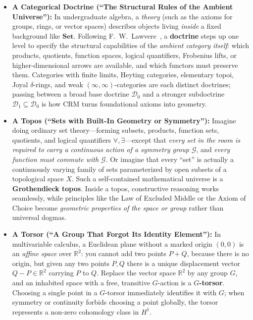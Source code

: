 \documentclass[10pt,twoside,openright]{book}
\theoremstyle{crmplain}
\theoremstyle{crmdef}
\theoremstyle{crmremark}
\begin{document}
\begin{itemize}
  \item \textbf{A Categorical Doctrine (``The Structural Rules of the Ambient Universe''):} In undergraduate algebra, a \emph{theory} (such as the axioms for groups, rings, or vector spaces) describes objects living \emph{inside} a fixed background like $\mathbf{Set}$. Following F.~W.~Lawvere~\cite{Lawvere69}, a \textbf{doctrine} steps up one level to specify the structural capabilities of the \emph{ambient category itself}: which products, quotients, function spaces, logical quantifiers, Frobenius lifts, or higher-dimensional arrows are available, and which functors must preserve them. Categories with finite limits, Heyting categories, elementary topoi, Joyal $\delta$-rings, and weak $(\infty, \infty)$-categories are each distinct doctrines; passing between a broad base doctrine $\mathcal{D}_0$ and a stronger subdoctrine $\mathcal{D}_1 \subseteq \mathcal{D}_0$ is how CRM turns foundational axioms into geometry.
  \item \textbf{A Topos (``Sets with Built-In Geometry or Symmetry''):} Imagine doing ordinary set theory---forming subsets, products, function sets, quotients, and logical quantifiers $\forall, \exists$---except that \emph{every set in the room is required to carry a continuous action of a symmetry group $\mathcal{G}$}, and \emph{every function must commute with $\mathcal{G}$}. Or imagine that every ``set'' is actually a continuously varying family of sets parameterized by open subsets of a topological space $X$. Such a self-contained mathematical universe is a \textbf{Grothendieck topos}. Inside a topos, constructive reasoning works seamlessly, while principles like the Law of Excluded Middle or the Axiom of Choice become \emph{geometric properties of the space or group} rather than universal dogmas.
  \item \textbf{A Torsor (``A Group That Forgot Its Identity Element''):} In multivariable calculus, a Euclidean plane without a marked origin $(0, 0)$ is an \emph{affine space} over $\mathbb{R}^2$: you cannot add two points $P + Q$, because there is no origin, but given any two points $P, Q$ there is a unique displacement vector $Q - P \in \mathbb{R}^2$ carrying $P$ to $Q$. Replace the vector space $\mathbb{R}^2$ by any group $G$, and an inhabited space with a free, transitive $G$-action is a \textbf{$G$-torsor}. Choosing a single point in a $G$-torsor immediately identifies it with $G$; when symmetry or continuity forbids choosing a point globally, the torsor represents a non-zero cohomology class in $H^1$.

\end{itemize}
\end{document}
